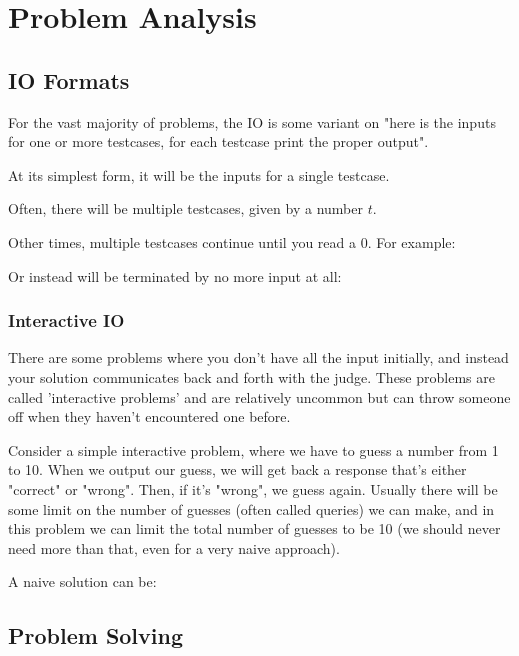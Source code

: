 \section{Problem Analysis}
\subsection{IO Formats}

For the vast majority of problems, the IO is some variant on "here is the inputs for one or more testcases, for each testcase print the proper output".

At its simplest form, it will be the inputs for a single testcase.


Often, there will be multiple testcases, given by a number $t$.


Other times, multiple testcases continue until you read a 0. For example:


Or instead will be terminated by no more input at all:


\subsubsection{Interactive IO}

There are some problems where you don't have all the input initially, and instead your solution communicates back and forth with the judge. These problems are called 'interactive problems' and are relatively uncommon but can throw someone off when they haven't encountered one before.

Consider a simple interactive problem, where we have to guess a number from 1 to 10. When we output our guess, we will get back a response that's either "correct" or "wrong". Then, if it's "wrong", we guess again. Usually there will be some limit on the number of guesses (often called queries) we can make, and in this problem we can limit the total number of guesses to be 10 (we should never need more than that, even for a very naive approach).

A naive solution can be:


\subsection{Problem Solving}

